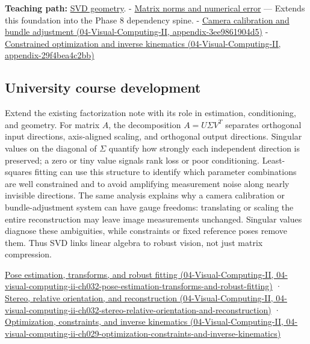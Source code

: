 \textbf{Teaching path:} \hyperref[02-foundations-ii-ch024-singular-value-decomposition-covers-every-rectangular-map]{SVD geometry}. - \hyperref[appendix-f8657bac66e5]{Matrix norms and numerical error} --- Extends this foundation into the Phase 8 dependency spine. - \href{../04-Visual-Computing-II/main.pdf\#nameddest=appendix-3ee9861904d5}{Camera calibration and bundle adjustment (04-Visual-Computing-II, appendix-3ee9861904d5)} - \href{../04-Visual-Computing-II/main.pdf\#nameddest=appendix-29f4bea4c2bb}{Constrained optimization and inverse kinematics (04-Visual-Computing-II, appendix-29f4bea4c2bb)}

\subsection{University course development}\label{appendix-1fad5e7f36fa-university-course-development}

Extend the existing factorization note with its role in estimation, conditioning, and geometry. For matrix \(A\), the decomposition \(A=U\Sigma V^T\) separates orthogonal input directions, axis-aligned scaling, and orthogonal output directions. Singular values on the diagonal of \(\Sigma\) quantify how strongly each independent direction is preserved; a zero or tiny value signals rank loss or poor conditioning. Least-squares fitting can use this structure to identify which parameter combinations are well constrained and to avoid amplifying measurement noise along nearly invisible directions. The same analysis explains why a camera calibration or bundle-adjustment system can have gauge freedoms: translating or scaling the entire reconstruction may leave image measurements unchanged. Singular values diagnose these ambiguities, while constraints or fixed reference poses remove them. Thus SVD links linear algebra to robust vision, not just matrix compression.

\href{../04-Visual-Computing-II/main.pdf\#nameddest=04-visual-computing-ii-ch032-pose-estimation-transforms-and-robust-fitting}{Pose estimation, transforms, and robust fitting (04-Visual-Computing-II, 04-visual-computing-ii-ch032-pose-estimation-transforms-and-robust-fitting)} · \href{../04-Visual-Computing-II/main.pdf\#nameddest=04-visual-computing-ii-ch032-stereo-relative-orientation-and-reconstruction}{Stereo, relative orientation, and reconstruction (04-Visual-Computing-II, 04-visual-computing-ii-ch032-stereo-relative-orientation-and-reconstruction)} · \href{../04-Visual-Computing-II/main.pdf\#nameddest=04-visual-computing-ii-ch029-optimization-constraints-and-inverse-kinematics}{Optimization, constraints, and inverse kinematics (04-Visual-Computing-II, 04-visual-computing-ii-ch029-optimization-constraints-and-inverse-kinematics)}
